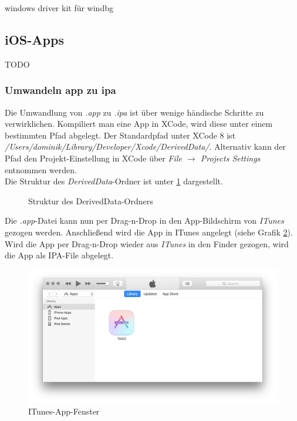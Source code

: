 windows driver kit für windbg

\subsection{iOS-Apps}
TODO

\subsubsection{Umwandeln app zu ipa}
Die Umwandlung von \textit{.app} zu \textit{.ipa} ist über wenige händische Schritte zu verwirklichen. Kompiliert man eine App in XCode, wird diese unter einem bestimmten Pfad abgelegt. Der Standardpfad unter XCode 8 ist \textit{/Users/dominik/Library/Developer/Xcode/DerivedData/}. Alternativ kann der Pfad den Projekt-Einstellung in XCode über \textit{File $\rightarrow$ Projects Settings} entnommen werden.\\

Die Struktur des \textit{DerivedData}-Ordner ist unter \ref{ref:deriveddata} dargestellt.
\begin{figure}
\label{ref:deriveddata}
\caption{Struktur des DerivedData-Ordners}
\end{figure}

Die \textit{.app}-Datei kann nun per Drag-n-Drop in den App-Bildschirm von \textit{ITunes} gezogen werden. Anschließend wird die App in ITunes angelegt (siehe Grafik \ref{fig:itunes_app}). Wird die App per Drag-n-Drop wieder aus \textit{ITunes} in den Finder gezogen, wird die App als IPA-File abgelegt.

\begin{figure}[htbp]
	\centering
	\includegraphics[width=\textwidth]{bilder/pentest_mobile_anwendungen/weiterentw_mobsf/itunes_app.png}
	\caption{ITunes-App-Fenster}
	\label{fig:itunes_app}
\end{figure}

